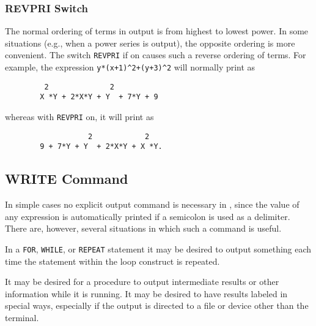 \subsubsection{REVPRI Switch}

The normal ordering of terms in output is from highest to lowest power.
In some situations (e.g., when a power series is output), the opposite
ordering is more convenient.  The switch {\tt REVPRI} if on causes such a
reverse ordering of terms.  For example, the expression
{\tt y*(x+1)\verb|^|2+(y+3)\verb|^|2} will normally print as
\begin{verbatim}
         2              2
        X *Y + 2*X*Y + Y  + 7*Y + 9
\end{verbatim}
whereas with {\tt REVPRI} on, it will print as
\begin{verbatim}
                   2            2
        9 + 7*Y + Y  + 2*X*Y + X *Y.
\end{verbatim}

\hypertarget{WRITE}{\subsection{WRITE Command}}

In simple cases no explicit output command is necessary in
{\REDUCE}, since the value of any expression is automatically printed if a
semicolon is used as a delimiter.  There are, however, several situations
in which such a command is useful.

In a {\tt FOR}, {\tt WHILE}, or {\tt REPEAT} statement it may be desired
to output something each time the statement within the loop construct is
repeated.

It may be desired for a procedure to output intermediate results or other
information while it is running. It may be desired to have results labeled
in special ways, especially if the output is directed to a file or device
other than the terminal.

